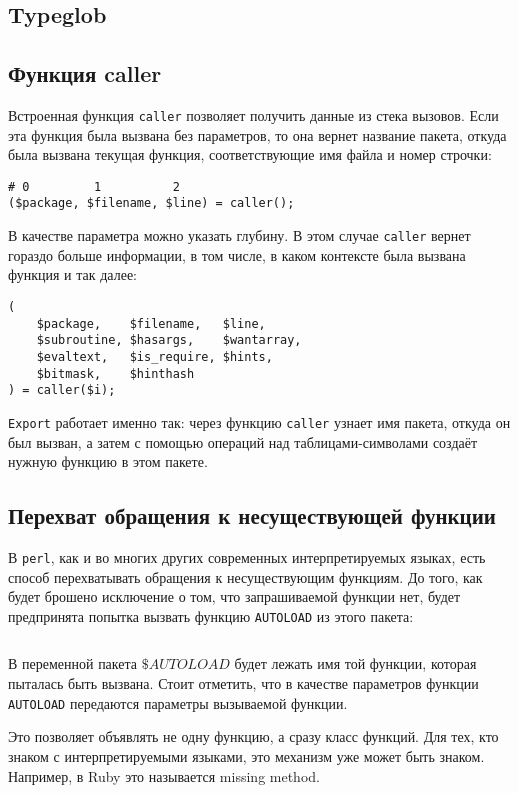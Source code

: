 
\subsection{Typeglob} %


\subsection{Функция caller} %
Встроенная функция \verb|caller| позволяет получить данные из стека вызовов. Если эта функция была вызвана без параметров, то она вернет название пакета, откуда была вызвана текущая функция, соответствующие имя файла и номер строчки:
\begin{verbatim}
# 0         1          2
($package, $filename, $line) = caller();
\end{verbatim}
В качестве параметра можно указать глубину. В этом случае \verb|caller| вернет гораздо больше информации, в том числе, в каком контексте была вызвана функция и так далее:
\begin{verbatim}
(
	$package,    $filename,   $line,
	$subroutine, $hasargs,    $wantarray,
	$evaltext,   $is_require, $hints,
	$bitmask,    $hinthash
) = caller($i);
\end{verbatim}
\verb|Export| работает именно так: через функцию \verb|caller| узнает имя пакета, откуда он был вызван, а затем с помощью операций над таблицами-символами создаёт нужную функцию в этом пакете.

\subsection{Перехват обращения к несуществующей функции} %
В \verb|perl|, как и во многих других современных интерпретируемых языках, есть способ перехватывать обращения к несуществующим функциям. До того, как будет брошено исключение о том, что запрашиваемой функции нет, будет предпринята попытка вызвать функцию \verb|AUTOLOAD| из этого пакета:
\begin{verbatim}
\end{verbatim}
В переменной пакета $\$AUTOLOAD$ будет лежать имя той функции, которая пыталась быть вызвана. Стоит отметить, что в качестве параметров функции \verb|AUTOLOAD| передаются параметры вызываемой функции.

Это позволяет объявлять не одну функцию, а сразу класс функций. Для тех, кто знаком с интерпретируемыми языками, это механизм уже может быть знаком. Например, в Ruby это называется missing method.

